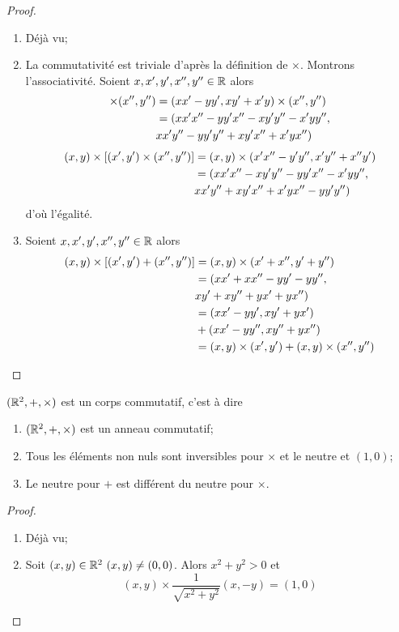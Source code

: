 \begin{proof}
  \begin{enumerate}
  \item Déjà vu;
  \item La commutativité est triviale d'après la définition de \(\times\). Montrons l'associativité. Soient \(x,x',y',x'',y'' \in \mathbb{R}\) alors
    \begin{align}
      [(x,y) \times (x',y')] \times (x'',y'') &= (xx'-yy',xy'+x'y) \times (x'',y'')\\
      &=(xx'x''-yy'x''-xy'y''-x'yy'', \notag \\
      &xx'y''-yy'y''+xy'x''+x'yx'')
    \end{align}
    \begin{align}
      (x,y)\times [(x',y') \times (x'',y'')] &= (x,y) \times (x'x''-y'y'',x'y''+x''y')\\
      &=(xx'x''-xy'y''-yy'x''-x'yy'', \notag \\
      & xx'y''+xy'x''+x'yx''-yy'y'')
    \end{align}
    d'où l'égalité.
  \item Soient \(x,x',y',x'',y'' \in \mathbb{R}\) alors
    \begin{align}
      (x,y) \times [(x',y')+(x'',y'')] &= (x,y) \times (x'+x'',y'+y'')\\
      &=(xx'+xx''-yy'-yy'', \notag \\ &xy'+xy''+yx'+yx'')\\
      &=(xx'-yy',xy'+yx') \notag \\
      & + (xx'-yy'',xy''+yx'')\\
      &=(x,y) \times (x',y') +(x,y)\times (x'',y'')
    \end{align}
  \end{enumerate}
\end{proof}
\begin{prop}
  \((\mathbb{R}^2,+,\times)\) est un corps commutatif, c'est à dire
  \begin{enumerate}
  \item \((\mathbb{R}^2,+,\times)\) est un anneau commutatif;
  \item Tous les éléments non nuls sont inversibles pour \(\times\) et le neutre et \((1,0)\);
  \item Le neutre pour \(+\) est différent du neutre pour \(\times\).
  \end{enumerate}
\end{prop}
\begin{proof}
  \begin{enumerate}
  \item Déjà vu;
  \item Soit \((x,y) \in \mathbb{R}^2 \ (x,y) \neq (0,0)\). Alors \(x^2+y^2>0\) et
    \begin{equation}
      (x,y) \times \frac{1}{\sqrt{x^2+y^2}} (x,-y) = (1,0)
    \end{equation}
  \end{enumerate}
\end{proof}
